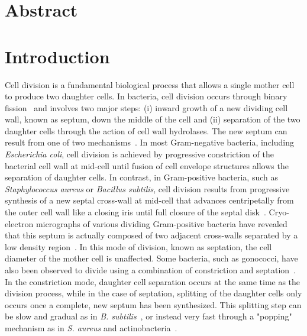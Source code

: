 \section{Abstract}

\section{Introduction}

Cell division is a fundamental biological process that allows a single mother cell to produce two daughter cells.
In bacteria, cell division occurs through binary fission~\cite{harryBacterialCellDivision2006} and involves two major steps: (i) inward growth of a new dividing cell wall, known as septum, down the middle of the cell and (ii) separation of the two daughter cells through the action of cell wall hydrolases.
The new septum can result from one of two mechanisms~\cite{ericksonHowBacterialCell2017}.
In most Gram-negative bacteria, including \textit{Escherichia coli}, cell division is achieved by progressive constriction of the bacterial cell wall at mid-cell until fusion of cell envelope structures allows the separation of daughter cells.
In contrast, in Gram-positive bacteria, such as \textit{Staphylococcus aureus} or \textit{Bacillus subtilis}, cell division results from progressive synthesis of a new septal cross-wall at mid-cell that advances centripetally from the outer cell wall like a closing iris until full closure of the septal disk~\cite{beveridgeUltrastructureGramPositiveCell2006,giesbrechtStaphylococcalCellWall1998}.
Cryo-electron micrographs of various dividing Gram-positive bacteria have revealed that this septum is actually composed of two adjacent cross-walls separated by a low density region~\cite{matiasNativeCellWall2006,matiasCryoelectronMicroscopyCell2007,zuberGranularLayerPeriplasmic2006,sextonSuperresolutionConfocalCryoCLEM2022,murrayCellDivisionDeinococcus1983}.
In this mode of division, known as septation, the cell diameter of the mother cell is unaffected.
Some bacteria, such as gonococci, have also been observed to divide using a combination of constriction and septation~\cite{westling-haggstromGrowthPatternCell1977}.
In the constriction mode, daughter cell separation occurs at the same time as the division process, while in the case of septation, splitting of the daughter cells only occurs once a complete, new septum has been synthesized.
This splitting step can be slow and gradual as in \textit{B. subtilis}~\cite{smithAutolysinsBacillusSubtilis2000}, or instead very fast through a "popping" mechanism as in \textit{S. aureus} and actinobacteria~\cite{monteiroCellShapeDynamics2015,zhouMechanicalCrackPropagation2015,zhouFastMechanicallyDriven2016}.

